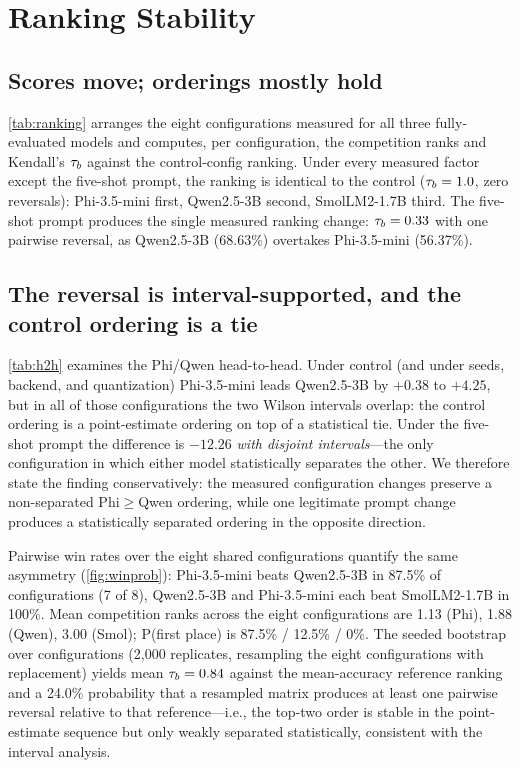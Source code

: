 \section{Ranking Stability}
\label{sec:ranking}



\subsection{Scores move; orderings mostly hold}
\cref{tab:ranking} arranges the eight configurations measured for all three
fully-evaluated models and computes, per configuration, the competition
ranks and Kendall's $\tau_b$ against the control-config ranking. Under every
measured factor except the five-shot prompt, the ranking is identical to
the control ($\tau_b = 1.0$, zero reversals): Phi-3.5-mini first, Qwen2.5-3B
second, SmolLM2-1.7B third. The five-shot prompt produces the single
measured ranking change: $\tau_b = 0.33$ with one pairwise reversal, as
Qwen2.5-3B (68.63\%) overtakes Phi-3.5-mini (56.37\%).

\subsection{The reversal is interval-supported, and the control ordering is a tie}
\cref{tab:h2h} examines the Phi/Qwen head-to-head. Under control (and under
seeds, backend, and quantization) Phi-3.5-mini leads Qwen2.5-3B by
$+0.38$ to $+4.25$\pp, but in all of those configurations the two Wilson
intervals overlap: the control ordering is a point-estimate ordering on top
of a statistical tie. Under the five-shot prompt the difference is
$-12.26$\pp{} \emph{with disjoint intervals}---the only configuration in
which either model statistically separates the other. We therefore state
the finding conservatively: the measured configuration changes preserve a
non-separated Phi$\geq$Qwen ordering, while one legitimate prompt change
produces a statistically separated ordering in the opposite direction.

Pairwise win rates over the eight shared configurations quantify the same
asymmetry (\cref{fig:winprob}): Phi-3.5-mini beats Qwen2.5-3B in 87.5\% of
configurations (7 of 8), Qwen2.5-3B and Phi-3.5-mini each beat SmolLM2-1.7B
in 100\%. Mean competition ranks across the eight configurations are
1.13 (Phi), 1.88 (Qwen), 3.00 (Smol); P(first place) is 87.5\% / 12.5\% /
0\%. The seeded bootstrap over configurations (2{,}000 replicates, resampling
the eight configurations with replacement) yields mean $\tau_b=0.84$
against the mean-accuracy reference ranking and a 24.0\% probability that a
resampled matrix produces at least one pairwise reversal relative to that
reference---i.e., the top-two order is stable in the point-estimate
sequence but only weakly separated statistically, consistent with the
interval analysis.

